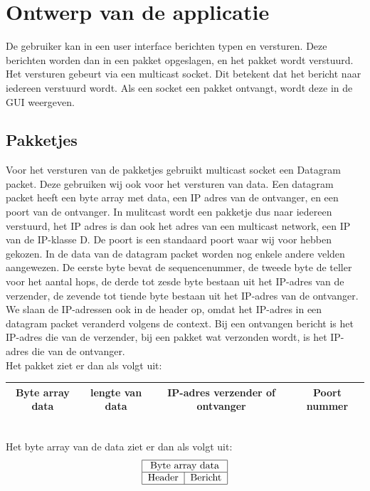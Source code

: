 \documentclass{article}
\begin{document}
\newpage

\section{Ontwerp van de applicatie}
De gebruiker kan in een user interface berichten typen en versturen. Deze berichten worden dan in een pakket opgeslagen, en het pakket wordt verstuurd. Het versturen gebeurt via een multicast socket. Dit betekent dat het bericht naar iedereen verstuurd wordt. Als een socket een pakket ontvangt, wordt deze in de GUI weergeven. 

\subsection{Pakketjes}
Voor het versturen van de pakketjes gebruikt multicast socket een Datagram packet. Deze gebruiken wij ook voor het versturen van data. Een datagram packet heeft een byte array met data, een IP adres van de ontvanger, en een poort van de ontvanger. In mulitcast wordt een pakketje dus naar iedereen verstuurd, het IP adres is dan ook het adres van een multicast network, een IP van de IP-klasse D. De poort is een standaard poort waar wij voor hebben gekozen. In de data van de datagram packet worden nog enkele andere velden aangewezen. De eerste byte bevat de sequencenummer, de tweede byte de teller voor het aantal hops, de derde tot zesde byte bestaan uit het IP-adres van de verzender, de zevende tot tiende byte bestaan uit het IP-adres van de ontvanger. We slaan de IP-adressen ook in de header op, omdat het IP-adres in een datagram packet veranderd volgens de context. Bij een ontvangen bericht is het IP-adres die van de verzender, bij een pakket wat verzonden wordt, is het IP-adres die van de ontvanger. \\


\noindent Het pakket ziet er dan als volgt uit:
\\
\begin{tabular}{|c|c|c|c|}
\hline
Byte array data & lengte van data & IP-adres verzender of ontvanger & Poort nummer \\
\hline
\end{tabular}
\\

\noindent Het byte array van de data ziet er dan als volgt uit:
\begin{align*}
\begin{tabular}[center]{| c | c |}
\hline
\multicolumn{2}{|c|}{Byte array data}  \\
\hline
Header & Bericht \\
\hline
\end{tabular}
\end{align*}
\\
\end{document}
